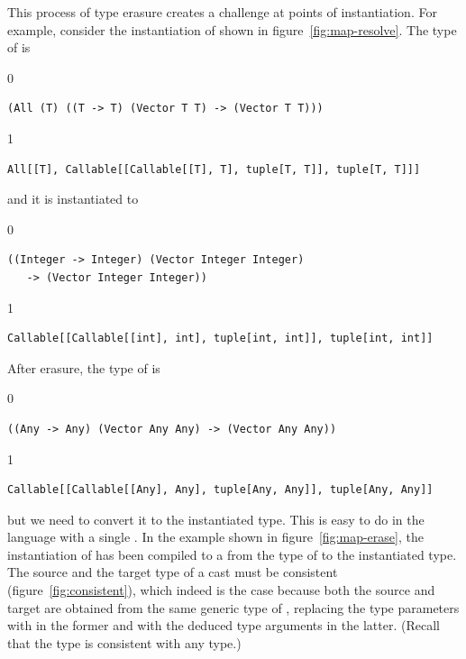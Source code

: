 \documentclass[7x10]{TimesAPriori_MIT}%
\def\racketEd{0}
\def\pythonEd{1}
\def\edition{1}
\newcommand{\pythonColor}[0]{}
\numberwithin{theorem}{chapter}
\numberwithin{definition}{chapter}
\numberwithin{equation}{chapter}
\begin{document}
This process of type erasure creates a challenge at points of
instantiation. For example, consider the instantiation of
 shown in figure~\ref{fig:map-resolve}.
The type of  is
%
{\if\edition\racketEd    
\begin{lstlisting}
(All (T) ((T -> T) (Vector T T) -> (Vector T T)))
\end{lstlisting}
\fi}
{\if\edition\pythonEd\pythonColor    
\begin{lstlisting}
All[[T], Callable[[Callable[[T], T], tuple[T, T]], tuple[T, T]]]
\end{lstlisting}
\fi}
%
and it is instantiated to 
%
{\if\edition\racketEd
\begin{lstlisting}
((Integer -> Integer) (Vector Integer Integer)
   -> (Vector Integer Integer))
\end{lstlisting}
\fi}
{\if\edition\pythonEd\pythonColor
\begin{lstlisting}
Callable[[Callable[[int], int], tuple[int, int]], tuple[int, int]]
\end{lstlisting}
\fi}
%
After erasure, the type of  is
%
{\if\edition\racketEd
\begin{lstlisting}
((Any -> Any) (Vector Any Any) -> (Vector Any Any))
\end{lstlisting}
\fi}
{\if\edition\pythonEd\pythonColor
\begin{lstlisting}
Callable[[Callable[[Any], Any], tuple[Any, Any]], tuple[Any, Any]]
\end{lstlisting}
\fi}
%
but we need to convert it to the instantiated type.  This is easy to
do in the language \LangCast{} with a single .  In the
example shown in figure~\ref{fig:map-erase}, the instantiation of
 has been compiled to a  from the type of
 to the instantiated type. The source and the target type of a
cast must be consistent (figure~\ref{fig:consistent}), which indeed is
the case because both the source and target are obtained from the same
generic type of , replacing the type parameters with
\CANYTY{} in the former and with the deduced type arguments in the
latter. (Recall that the \CANYTY{} type is consistent with any type.)
\end{document}

